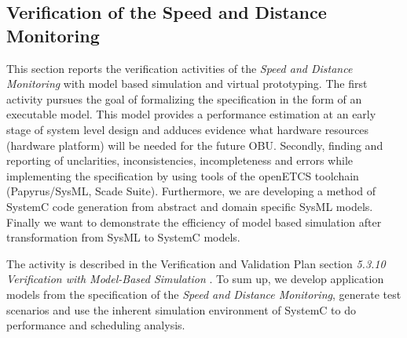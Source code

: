 %
%
%
%
%
%
%


\subsection{Verification of the Speed and Distance Monitoring}

This section reports the verification activities of the \emph{Speed and Distance Monitoring} with model based simulation and virtual prototyping. The first activity pursues the goal of formalizing the specification in the form of an executable model. This model provides a performance estimation at an early stage of system level design and adduces evidence what hardware resources (hardware platform) will be needed for the future OBU. Secondly, finding and reporting of unclarities, inconsistencies, incompleteness and errors while implementing the specification by using tools of the openETCS toolchain (Papyrus/SysML, Scade Suite). Furthermore, we are developing a method of SystemC code generation from abstract and domain specific SysML models. Finally we want to demonstrate the efficiency of model based simulation after transformation from SysML to SystemC models.

The activity is described in the Verification and Validation Plan section {\em 5.3.10 Verification with Model-Based Simulation} \cite{D4.1_2013}. To sum up, we develop application models from the specification of the \emph{Speed and Distance Monitoring}, generate test scenarios and use the inherent simulation environment of SystemC to do performance and scheduling analysis.

